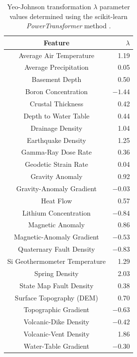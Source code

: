 \begin{table}[htp]
\centering
\begin{tabular}{|c|r|}
\hline
\textbf{Feature} & \textbf{$\lambda$} \\ \hline
Average Air Temperature & 1.19 \\ \hline
Average Precipitation & 0.05 \\ \hline
Basement Depth & 0.50 \\ \hline
Boron Concentration & $-1.44$ \\ \hline
Crustal Thickness & 0.42 \\ \hline
Depth to Water Table & 0.44 \\ \hline
Drainage Density & 1.04 \\ \hline
Earthquake Density & 1.25 \\ \hline
Gamma-Ray Dose Rate & 0.36 \\ \hline
Geodetic Strain Rate & 0.04 \\ \hline
Gravity Anomaly & 0.92 \\ \hline
Gravity-Anomaly Gradient & $-0.03$ \\ \hline
Heat Flow & 0.57 \\ \hline
Lithium Concentration & $-0.84$ \\ \hline
Magnetic Anomaly & 0.86 \\ \hline
Magnetic-Anomaly Gradient & $-0.53$ \\ \hline
Quaternary Fault Density & $-0.83$ \\ \hline
Si Geothermometer Temperature & 1.29 \\ \hline
Spring Density & 2.03 \\ \hline
State Map Fault Density & 0.38 \\ \hline
Surface Topography (DEM) & 0.70 \\ \hline
Topographic Gradient & $-0.63$ \\ \hline
Volcanic-Dike Density & $-0.42$ \\ \hline
Volcanic-Vent Density & 1.86 \\ \hline
Water-Table Gradient & $-0.30$ \\ \hline
\end{tabular}
\caption[Yeo-Johnson transformation lambda values]{Yeo-Johnson transformation $\lambda$ parameter values determined using the scikit-learn \textit{PowerTransformer} method \protect\citep{scikit-learn_sklearnpreprocessingpowertransformer_2021}.}
\label{tab:yeo_lambdas}
\end{table}


